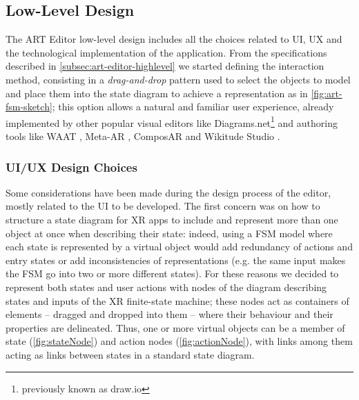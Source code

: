 \subsection{Low-Level Design}
\label{subsec:art-editor-lowlevel}

The ART Editor low-level design includes all the choices related to UI, UX and the technological implementation of the application.
From the specifications described in \autoref{subsec:art-editor-highlevel} we started defining the interaction method, consisting in a \emph{drag-and-drop} pattern used to select the objects to model and place them into the state diagram to achieve a representation as in \autoref{fig:art-fsm-sketch}; this option allows a natural and familiar user experience, already implemented by other popular visual editors like Diagrams.net\footnote{previously known as draw.io} and authoring tools like WAAT \cite{de_paolis_waat_2020}, Meta-AR \cite{villanueva_meta-ar-app_2020}, ComposAR and Wikitude Studio \cite{stephanidis_authoring_2020}.

\subsubsection*{UI/UX Design Choices}
\label{subsub:art-editor-uiux}
Some considerations have been made during the design process of the editor, mostly related to the UI to be developed. The first concern was on how to structure a state diagram for XR apps to include and represent more than one object at once when describing their state: indeed, using a \gls{FSM} model where each state is represented by a virtual object would add redundancy of actions and entry states or add inconsistencies of representations (e.g. the same input makes the \gls{FSM} go into two or more different states). For these reasons we decided to represent both states and user actions with nodes of the diagram describing states and inputs of the \gls{XR} finite-state machine; these nodes act as containers of elements -- dragged and dropped into them -- where their behaviour and their properties are delineated. Thus, one or more virtual objects can be a member of state (\autoref{fig:stateNode}) and action nodes (\autoref{fig:actionNode}), with links among them acting as links between states in a standard state diagram.

